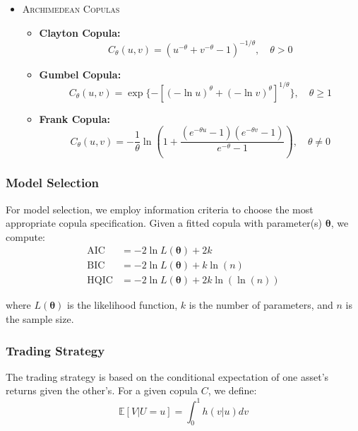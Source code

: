 \begin{itemize}
	\item \textsc{Archimedean Copulas}
\begin{itemize}
    \item \textbf{Clayton Copula:}
\begin{equation*}
	C_{\theta}(u,v) = (u^{-\theta} + v^{-\theta} - 1)^{-1/\theta}, \quad \theta > 0
\end{equation*}

    \item \textbf{Gumbel Copula:}
\begin{equation*}
	C_{\theta}(u,v) = \exp\{-[(-\ln u)^{\theta} + (-\ln v)^{\theta}]^{1/\theta}\}, \quad \theta \geq 1
\end{equation*}

    \item \textbf{Frank Copula:}
\begin{equation*}
	C_{\theta}(u,v) = -\frac{1}{\theta}\ln\left(1 + \frac{(e^{-\theta u}-1)(e^{-\theta v}-1)}{e^{-\theta}-1}\right), \quad \theta \neq 0
\end{equation*}
\end{itemize}
\end{itemize}


\subsubsection{Model Selection}

For model selection, we employ information criteria to choose the most appropriate copula specification. Given a fitted copula with parameter(s) $\boldsymbol{\theta}$, we compute:
\begin{align*}
\text{AIC} &= -2\ln L(\boldsymbol{\theta}) + 2k \\
\text{BIC} &= -2\ln L(\boldsymbol{\theta}) + k\ln(n) \\
\text{HQIC} &= -2\ln L(\boldsymbol{\theta}) + 2k\ln(\ln(n))
\end{align*}

where $L(\boldsymbol{\theta})$ is the likelihood function, $k$ is the number of parameters, and $n$ is the sample size.

\subsubsection{Trading Strategy}
The trading strategy is based on the conditional expectation of one asset's returns given the other's. For a given copula $C$, we define:
\begin{equation*}
	\mathbb{E}[V|U=u] = \int_0^1 h(v|u)dv
\end{equation*}

